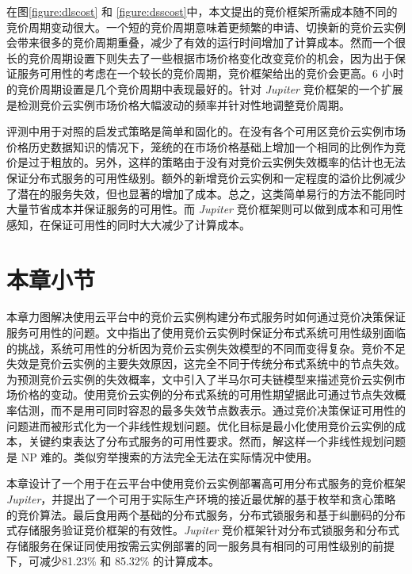 在图\ref{figure:dlscost} 和 \ref{figure:dsscost}中，本文提出的竞价框架所需成本随不同的竞价周期变动很大。一个短的竞价周期意味着更频繁的申请、切换新的竞价云实例会带来很多的竞价周期重叠，减少了有效的运行时间增加了计算成本。然而一个很长的竞价周期设置下则失去了一些根据市场价格变化改变竞价的机会，因为出于保证服务可用性的考虑在一个较长的竞价周期，竞价框架给出的竞价会更高。6 小时的竞价周期设置是几个竞价周期中表现最好的。针对 \emph{Jupiter} 竞价框架的一个扩展是检测竞价云实例市场价格大幅波动的频率并针对性地调整竞价周期。

评测中用于对照的启发式策略是简单和固化的。在没有各个可用区竞价云实例市场价格历史数据知识的情况下，笼统的在市场价格基础上增加一个相同的比例作为竞价是过于粗放的。另外，这样的策略由于没有对竞价云实例失效概率的估计也无法保证分布式服务的可用性级别。额外的新增竞价云实例和一定程度的溢价比例减少了潜在的服务失效，但也显著的增加了成本。总之，这类简单易行的方法不能同时大量节省成本并保证服务的可用性。而 \emph{Jupiter} 竞价框架则可以做到成本和可用性感知，在保证可用性的同时大大减少了计算成本。

\section{本章小节}
\label{sec:jupiter-conclusion}
本章力图解决使用云平台中的竞价云实例构建分布式服务时如何通过竞价决策保证服务可用性的问题。文中指出了使用竞价云实例时保证分布式系统可用性级别面临的挑战，系统可用性的分析因为竞价云实例失效模型的不同而变得复杂。竞价不足失效是竞价云实例的主要失效原因，这完全不同于传统分布式系统中的节点失效。为预测竞价云实例的失效概率，文中引入了半马尔可夫链模型来描述竞价云实例市场价格的变动。使用竞价云实例的分布式系统的可用性期望据此可通过节点失效概率估测，而不是用可同时容忍的最多失效节点数表示。通过竞价决策保证可用性的问题进而被形式化为一个非线性规划问题。优化目标是最小化使用竞价云实例的成本，关键约束表达了分布式服务的可用性要求。然而，解这样一个非线性规划问题是 NP 难的。类似穷举搜索的方法完全无法在实际情况中使用。

本章设计了一个用于在云平台中使用竞价云实例部署高可用分布式服务的竞价框架 \emph{Jupiter}，并提出了一个可用于实际生产环境的接近最优解的基于枚举和贪心策略的竞价算法。最后食用两个基础的分布式服务，分布式锁服务和基于纠删码的分布式存储服务验证竞价框架的有效性。\emph{Jupiter} 竞价框架针对分布式锁服务和分布式存储服务在保证同使用按需云实例部署的同一服务具有相同的可用性级别的前提下，可减少81.23\% 和 85.32\% 的计算成本。
